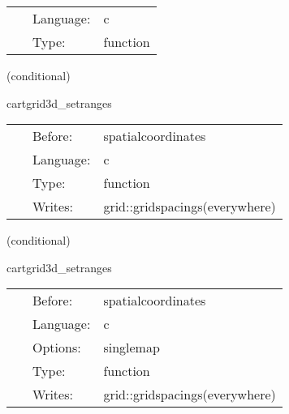 \hspace{5mm}{\it check coordinates for cartgrid3d } 


\hspace{5mm}

 \begin{tabular*}{160mm}{cll} 
~ & Language:  & c \\ 
~ & Type:  & function \\ 
\end{tabular*} 


\vspace{5mm}

   (conditional) 

\hspace{5mm} cartgrid3d\_setranges 

\hspace{5mm}{\it set up ranges for spatial 3d cartesian coordinates (on all grids) } 


\hspace{5mm}

 \begin{tabular*}{160mm}{cll} 
~ & Before:  & spatialcoordinates \\ 
~ & Language:  & c \\ 
~ & Type:  & function \\ 
~ & Writes:  & grid::gridspacings(everywhere) \\ 
\end{tabular*} 


\vspace{5mm}

   (conditional) 

\hspace{5mm} cartgrid3d\_setranges 

\hspace{5mm}{\it set up ranges for spatial 3d cartesian coordinates (on all maps) } 


\hspace{5mm}

 \begin{tabular*}{160mm}{cll} 
~ & Before:  & spatialcoordinates \\ 
~ & Language:  & c \\ 
~ & Options:  & singlemap \\ 
~ & Type:  & function \\ 
~ & Writes:  & grid::gridspacings(everywhere) \\ 
\end{tabular*} 


